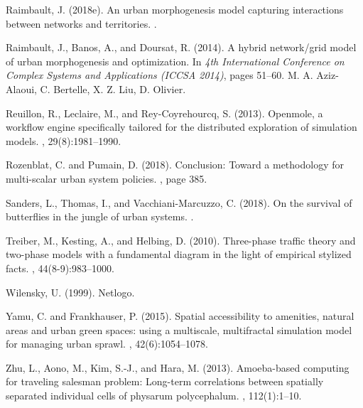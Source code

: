 \documentclass[11pt]{article}
\begin{document}
\begin{thebibliography}{}
Raimbault, J. (2018e).
\newblock An urban morphogenesis model capturing interactions between networks
  and territories.
.

Raimbault, J., Banos, A., and Doursat, R. (2014).
\newblock A hybrid network/grid model of urban morphogenesis and optimization.
\newblock In {\em 4th International Conference on Complex Systems and
  Applications (ICCSA 2014)}, pages 51--60. M. A. Aziz-Alaoui, C. Bertelle, X.
  Z. Liu, D. Olivier.

Reuillon, R., Leclaire, M., and Rey-Coyrehourcq, S. (2013).
\newblock Openmole, a workflow engine specifically tailored for the distributed
  exploration of simulation models.
, 29(8):1981--1990.

Rozenblat, C. and Pumain, D. (2018).
\newblock Conclusion: Toward a methodology for multi-scalar urban system
  policies.
,
  page 385.

Sanders, L., Thomas, I., and Vacchiani-Marcuzzo, C. (2018).
\newblock On the survival of butterflies in the jungle of urban systems.
.

Treiber, M., Kesting, A., and Helbing, D. (2010).
\newblock Three-phase traffic theory and two-phase models with a fundamental
  diagram in the light of empirical stylized facts.
,
  44(8-9):983--1000.

Wilensky, U. (1999).
\newblock Netlogo.

Yamu, C. and Frankhauser, P. (2015).
\newblock Spatial accessibility to amenities, natural areas and urban green
  spaces: using a multiscale, multifractal simulation model for managing urban
  sprawl.
,
  42(6):1054--1078.

Zhu, L., Aono, M., Kim, S.-J., and Hara, M. (2013).
\newblock Amoeba-based computing for traveling salesman problem: Long-term
  correlations between spatially separated individual cells of physarum
  polycephalum.
, 112(1):1--10.

\end{thebibliography}

\end{document}
